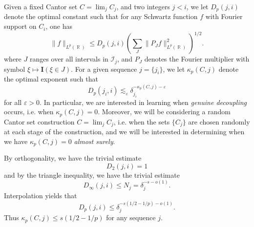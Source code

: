 \documentclass[dvipsnames,letterpaper,12pt]{article}
\numberwithin{equation}{section}
\DeclareMathOperator{\RR}{\mathbb{R}}
\numberwithin{theorem}{section}
\begin{document}
Given a fixed Cantor set $C = \lim_j C_j$, and two integers $j < i$, we let $D_p(j,i)$ denote the optimal constant such that for any Schwartz function $f$ with Fourier support on $C_i$, one has
%
\[ \| f \|_{L^p(\RR)} \leq D_p(j,i) \left( \sum_J \| P_J f \|_{L^p(\RR)}^2 \right)^{1/2}. \]
%
where $J$ ranges over all intervals in $\mathcal{I}_j$, and $P_J$ denotes the Fourier multiplier with symbol $\xi \mapsto \mathbf{I}(\xi \in J)$. For a given sequence $j = \{ j_i \}$, we let $\kappa_p(C,j)$ denote the optimal exponent such that
%
\[ D_p(j_i,i) \lesssim_\varepsilon \delta_{j_i}^{- \kappa_p(C,j) - \varepsilon} \]
%
for all $\varepsilon > 0$. In particular, we are interested in learning when \emph{genuine decoupling} occurs, i.e. when $\kappa_p(C,j) = 0$. Moreover, we will be considering a random Cantor set construction $C = \lim_j C_j$, i.e. when the sets $\{ C_j \}$ are chosen randomly at each stage of the construction, and we will be interested in determining when we have $\kappa_p(C,j) = 0$ \emph{almost surely}.

By orthogonality, we have the trivial estimate
%
\[ D_2(j,i) = 1 \]
%
and by the triangle inequality, we have the trivial estimate
%
\[ D_\infty(j,i) \leq N_j = \delta_j^{-s-o(1)}. \]
%
Interpolation yields that
%
\[ D_p(j,i) \leq \delta_j^{-s(1/2 - 1/p) - o(1)}. \]
%
Thus $\kappa_p(C,j) \leq s(1/2 - 1/p)$ for any sequence $j$.
\end{document}
